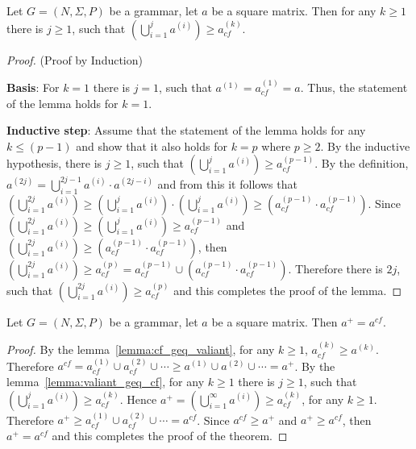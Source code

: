\begin{lemma}\label{lemma:valiant_geq_cf}
	Let $G =(N,\Sigma,P)$ be a grammar, let $a$ be a square matrix. Then for any $k \geq 1$ there is $j \geq 1$, such that $(\bigcup^{j}_{i=1}{a^{(i)}}) \geq a^{(k)}_{cf}$.
\end{lemma}
\begin{proof}(Proof by Induction)
	
	\textbf{Basis}: For $k = 1$ there is $j = 1$, such that $a^{(1)} = a^{(1)}_{cf} = a$. Thus, the statement of the lemma holds for $k = 1$.
	
	\textbf{Inductive step}: Assume that the statement of the lemma holds for any $k \leq (p - 1)$ and show that it also holds for $k = p$ where $p \geq 2$. By the inductive hypothesis, there is $j \geq 1$, such that $(\bigcup^{j}_{i=1}{a^{(i)}}) \geq a^{(p-1)}_{cf}$. By the definition, $a^{(2j)} = \bigcup^{2j-1}_{i=1}{a^{(i)} \cdot a^{(2j-i)}}$ and from this it follows that $(\bigcup^{2j}_{i=1}{a^{(i)}}) \geq (\bigcup^{j}_{i=1}{a^{(i)}}) \cdot (\bigcup^{j}_{i=1}{a^{(i)}}) \geq (a^{(p-1)}_{cf} \cdot a^{(p-1)}_{cf})$. Since $(\bigcup^{2j}_{i=1}{a^{(i)}}) \geq (\bigcup^{j}_{i=1}{a^{(i)}}) \geq a^{(p-1)}_{cf}$ and $(\bigcup^{2j}_{i=1}{a^{(i)}}) \geq (a^{(p-1)}_{cf} \cdot a^{(p-1)}_{cf})$, then $(\bigcup^{2j}_{i=1}{a^{(i)}}) \geq a^{(p)}_{cf} = a^{(p-1)}_{cf} \cup (a^{(p-1)}_{cf} \cdot a^{(p-1)}_{cf})$. Therefore there is $2j$, such that $(\bigcup^{2j}_{i=1}{a^{(i)}}) \geq a^{(p)}_{cf}$ and this completes the proof of the lemma.	
\end{proof}

\begin{mytheorem}\label{thm:closures}
	Let $G =(N,\Sigma,P)$ be a grammar, let $a$ be a square matrix. Then $a^+ = a^{cf}$.
\end{mytheorem}
\begin{proof}
	
	By the lemma~\ref{lemma:cf_geq_valiant}, for any $k \geq 1$, $a^{(k)}_{cf} \geq a^{(k)}$. Therefore $a^{cf} = a^{(1)}_{cf} \cup a^{(2)}_{cf} \cup \cdots \geq a^{(1)} \cup a^{(2)} \cup \cdots = a^+$. By the lemma~\ref{lemma:valiant_geq_cf}, for any $k \geq 1$ there is $j \geq 1$, such that $(\bigcup^{j}_{i=1}{a^{(i)}}) \geq a^{(k)}_{cf}$. Hence $a^+ = (\bigcup^{\infty}_{i=1}{a^{(i)}}) \geq a^{(k)}_{cf}$, for any $k \geq 1$. Therefore $a^+ \geq a^{(1)}_{cf} \cup a^{(2)}_{cf} \cup \cdots = a^{cf}$. Since $a^{cf} \geq a^+$ and $a^+ \geq a^{cf}$, then $a^+ = a^{cf}$ and this completes the proof of the theorem.
\end{proof}